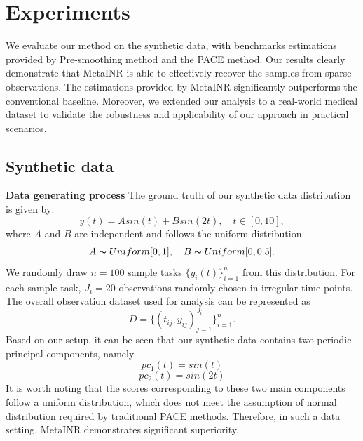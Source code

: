 \documentclass{article}
\begin{document}
\section{Experiments}
We evaluate our method on the synthetic data, with benchmarks estimations provided by Pre-smoothing method and the PACE method.
Our results clearly demonstrate that MetaINR is able to effectively recover the samples from sparse observations. The estimations provided by MetaINR significantly outperforms the conventional baseline. 
Moreover, we extended our analysis to a real-world medical dataset to validate the robustness and applicability of our approach in practical scenarios.
\subsection{Synthetic data}



\textbf{Data generating process}
The ground truth of our synthetic data distribution is given by:
$$
y(t)=A sin(t)+ B sin(2t), \quad t \in [0,10],
$$
where $A$ and $B$ are independent and follows the uniform distribution
$$
A \thicksim Uniform[0,1], \quad B \thicksim Uniform[0,0.5].
$$
We randomly draw $n=100$ sample tasks $\{y_i(t)\}_{i=1}^n$ from this distribution.
For each sample task, $J_i=20$ observations randomly chosen in irregular time points.
The overall observation dataset used for analysis can be represented as
$$
D=\{(t_{ij},y_{ij})_{j=1}^{J_i}\}_{i=1}^n.
$$
Based on our setup, it can be seen that our synthetic data contains two periodic principal components, namely
$$
pc_1(t)=sin(t)
$$
$$
pc_2(t)=sin(2t)
$$
It is worth noting that the scores corresponding to these two main components follow a uniform distribution, 
which does not meet the assumption of normal distribution required by traditional PACE methods. 
Therefore, in such a data setting, MetaINR demonstrates significant superiority.
\end{document}
